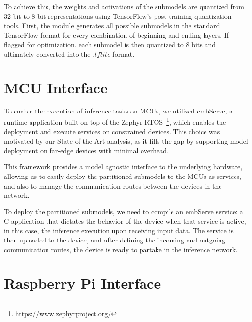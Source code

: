 To achieve this, the weights and activations of the submodels are quantized from 
32-bit to 8-bit representations using TensorFlow's post-training quantization tools. 
First, the module generates all possible submodels in the standard TensorFlow format 
for every combination of beginning and ending layers. If flagged for optimization, 
each submodel is then quantized to 8 bits and ultimately converted into the $.tflite$ 
format.


\section {MCU Interface} \label{sec:se43}

To enable the execution of inference tasks on \acp{MCU}, we utilized 
embServe\cite{embserve_oliveira_2023},
a runtime application built on top of the Zephyr RTOS~\footnote{https://www.zephyrproject.org/}, 
which enables the deployment and execute services on constrained devices. 
This choice was motivated by our State of the Art analysis, as it fills the gap by 
supporting model deployment on far-edge devices with minimal overhead.

This framework provides a model agnostic interface to the underlying hardware, allowing 
us to easily deploy the partitioned submodels to the \acp{MCU} as services, and also to 
manage the communication routes between the devices in the network.

To deploy the partitioned submodels, we need to compile an embServe service: a C
application that dictates the behavior of the device when that service is active,
in this case, the inference execution upon receiving input data. The service is then
uploaded to the device, and after defining the incoming and outgoing communication 
routes, the device is ready to partake in the inference network.


\section{Raspberry Pi Interface} \label{sec:se44}



